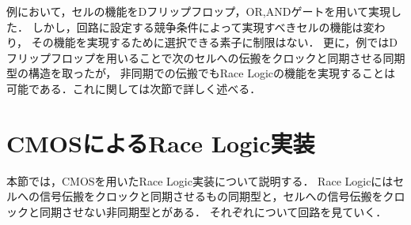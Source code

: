例において，セルの機能をDフリップフロップ，OR,ANDゲートを用いて実現した．
しかし，回路に設定する競争条件によって実現すべきセルの機能は変わり，
その機能を実現するために選択できる素子に制限はない．
更に，例ではDフリップフロップを用いることで次のセルへの伝搬をクロックと同期させる同期型の構造を取ったが，
非同期での伝搬でもRace Logicの機能を実現することは可能である．これに関しては次節で詳しく述べる．

\section{CMOSによるRace Logic実装}
本節では，CMOSを用いたRace Logic実装について説明する．
Race Logicにはセルへの信号伝搬をクロックと同期させるもの同期型と，セルへの信号伝搬をクロックと同期させない非同期型とがある．
それぞれについて回路を見ていく．

